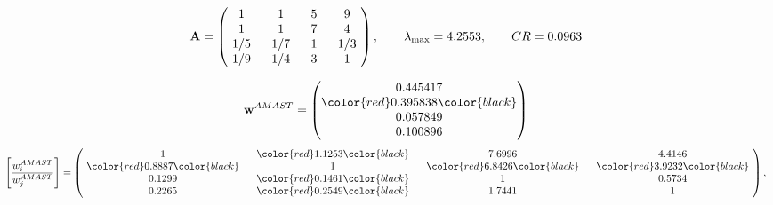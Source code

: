 \begin{example}
\begin{equation*}
\mathbf{A} =
\begin{pmatrix}
$\,\,$ 1 $\,\,$ & $\,\,$1$\,\,$ & $\,\,$5$\,\,$ & $\,\,$9 $\,\,$ \\
$\,\,$ 1 $\,\,$ & $\,\,$ 1 $\,\,$ & $\,\,$7$\,\,$ & $\,\,$4 $\,\,$ \\
$\,\,$ 1/5$\,\,$ & $\,\,$ 1/7$\,\,$ & $\,\,$ 1 $\,\,$ & $\,\,$ 1/3 $\,\,$ \\
$\,\,$ 1/9$\,\,$ & $\,\,$ 1/4$\,\,$ & $\,\,$3$\,\,$ & $\,\,$ 1  $\,\,$ \\
\end{pmatrix},
\qquad
\lambda_{\max} =
4.2553,
\qquad
CR = 0.0963
\end{equation*}

\begin{equation*}
\mathbf{w}^{AMAST} =
\begin{pmatrix}
0.445417\\
\color{red} 0.395838\color{black} \\
0.057849\\
0.100896
\end{pmatrix}\end{equation*}
\begin{equation*}
\left[ \frac{{w}^{AMAST}_i}{{w}^{AMAST}_j} \right] =
\begin{pmatrix}
$\,\,$ 1 $\,\,$ & $\,\,$\color{red} 1.1253\color{black} $\,\,$ & $\,\,$7.6996$\,\,$ & $\,\,$4.4146$\,\,$ \\
$\,\,$\color{red} 0.8887\color{black} $\,\,$ & $\,\,$ 1 $\,\,$ & $\,\,$\color{red} 6.8426\color{black} $\,\,$ & $\,\,$\color{red} 3.9232\color{black}   $\,\,$ \\
$\,\,$0.1299$\,\,$ & $\,\,$\color{red} 0.1461\color{black} $\,\,$ & $\,\,$ 1 $\,\,$ & $\,\,$0.5734 $\,\,$ \\
$\,\,$0.2265$\,\,$ & $\,\,$\color{red} 0.2549\color{black} $\,\,$ & $\,\,$1.7441$\,\,$ & $\,\,$ 1  $\,\,$ \\
\end{pmatrix},
\end{equation*}


\end{example}
